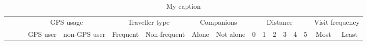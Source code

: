 \documentclass{sigchi}
\begin{document}
\begin{table}[t]
	\centering
	\caption{My caption}
	\begin{adjustbox}{width=1\textwidth}
		\small
		\label{between-subject-table}
		\begin{tabular}{ccccccccccccccccc}
			\cline{4-17}
			\multicolumn{1}{c}{}                                 & \multicolumn{1}{c}{}                         & \multicolumn{1}{c|}{}      & \multicolumn{2}{c|}{GPS usage}                                                                                       & \multicolumn{2}{c|}{Traveller type}                                                                                  & \multicolumn{2}{c|}{Companions}                                                                                               & \multicolumn{6}{c|}{Distance}                                                                                                                                                                                                                                                                                                            & \multicolumn{2}{c|}{Visit frequency}                                                                                 \\ \cline{4-17} 
			\multicolumn{1}{c}{}                                 & \multicolumn{1}{c}{}                         & \multicolumn{1}{c|}{}      & \multicolumn{1}{c|}{GPS user}                             & \multicolumn{1}{c|}{non-GPS user}                        & \multicolumn{1}{c|}{Frequent}                             & \multicolumn{1}{c|}{Non-frequent}                        & \multicolumn{1}{c|}{Alone}                                     & \multicolumn{1}{c|}{Not alone}                              & \multicolumn{1}{c|}{0}                                & \multicolumn{1}{c|}{1}                               & \multicolumn{1}{c|}{2}                               & \multicolumn{1}{c|}{3}                               & \multicolumn{1}{c|}{4}                               & \multicolumn{1}{c|}{5}                               & \multicolumn{1}{c|}{Most}                                 & \multicolumn{1}{c|}{Least}                               \\ \hline

\end{tabular}
\end{adjustbox}
\end{table}
\end{document}
